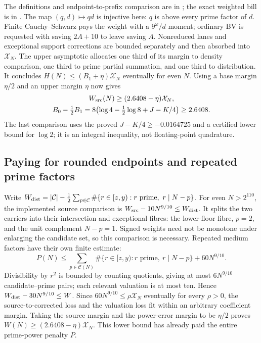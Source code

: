 The definitions and endpoint-to-prefix comparison are in
;
the exact weighted bill is in
.
The map $(q,d)\mapsto qd$ is injective here: $q$ is above every prime
factor of $d$.  Finite Cauchy--Schwarz pays the weight with a
$9^{\omega}/d$ moment; ordinary BV is requested with saving $2A+10$
to leave saving $A$.  Nonreduced lanes and exceptional support corrections
are bounded separately and then absorbed into $\mathcal X_N$.
The upper asymptotic allocates one third of its margin to density comparison,
one third to prime partial summation, and one third to distribution.
It concludes $H(N)\le(B_1+\eta)\mathcal X_N$ eventually for even $N$.
Using a base margin $\eta/2$ and an upper margin $\eta$ now gives
\[\begin{gathered}
 W_{\rm src}(N)\ge(2.6408-\eta)\mathcal X_N,\\
 B_0-\tfrac12B_1=8\bigl(\log4-\tfrac12\log8+J-K/4\bigr)\ge2.6408.
\end{gathered}\]
The last comparison uses the proved $J-K/4\ge-0.0164725$ and a certified
lower bound for $\log2$; it is an integral inequality, not floating-point quadrature.

\subsection{Paying for rounded endpoints and repeated prime factors}
Write $W_{\rm dist}=|\mathcal C|-\frac12\sum_{p\in\mathcal C}
\#\{r\in[z,y):r\text{ prime},\ r\mid N-p\}$.
For even $N>2^{110}$, the implemented source comparison is
$W_{\rm src}-10N^{9/10}\le W_{\rm dist}$.
It splits the two carriers into their intersection and exceptional fibres:
the lower-floor fibre, $p=2$, and the unit complement $N-p=1$.
Signed weights need not be monotone under enlarging the candidate set, so this comparison is necessary.
Repeated medium factors have their own finite estimate:
\[
 P(N)\le\sum_{p\in\mathcal C(N)}\#\{r\in[z,y):r\text{ prime},\ r\mid N-p\}
           +60N^{9/10}.
\]
Divisibility by $r^2$ is bounded by counting quotients, giving at most
$6N^{9/10}$ candidate--prime pairs; each relevant valuation is at most ten.
Hence $W_{\rm dist}-30N^{9/10}\le W$.
Since $60N^{9/10}\le\rho \mathcal X_N$ eventually for every $\rho>0$,
the source-to-corrected loss and the valuation loss fit within an arbitrary
coefficient margin.  Taking the source margin and the power-error margin
to be $\eta/2$ proves $W(N)\ge(2.6408-\eta)\mathcal X_N$.
This lower bound has already paid the entire prime-power penalty $P$.

